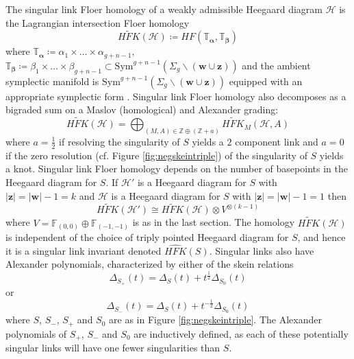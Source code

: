\documentclass[11pt]{amsart}
\theoremstyle{definition}
\theoremstyle{remark}
\def\F{\mathbb{F}}
\def\Z{\mathbb{Z}}
\def\talpha{\mathbb{T}_{\bm{\alpha}}}
\def\tbeta{\mathbb{T}_{\bm{\beta}}}
\def\Sym{\mathrm{Sym}}
\numberwithin{equation}{section}
\begin{document}
The singular link Floer homology of a weakly admissible Heegaard diagram $\mathcal{H}$ is the Lagrangian intersection Floer homology
\begin{equation}
    \widetilde{HFK}(\mathcal{H})\coloneq HF(\talpha,\tbeta)
\end{equation}
where $\talpha\coloneq \alpha_1\times\hdots\times \alpha_{g+n-1},$ $\tbeta\coloneq \beta_1\times\hdots\times \beta_{g+n-1}\subset \Sym^{g+n-1}(\Sigma_g\backslash(\bm{w}\cup\bm{z}))$ and the ambient symplectic manifold is $\Sym^{g+n-1}(\Sigma_g\backslash(\bm{w}\cup\bm{z}))$ equipped with an appropriate symplectic form \cite{perutz}.  Singular link Floer homology also decomposes as a bigraded sum on a Maslov (homological) and Alexander grading:
\begin{equation}
    \widetilde{HFK}(\mathcal{H})=\bigoplus_{(M,A)\in\Z\oplus (\Z+a)}\widetilde{HFK}_M(\mathcal{H},A)
\end{equation}
where $a=\frac{1}{2}$ if resolving the singularity of $S$ yields a $2$ component link and $a=0$ if the zero resolution (cf. Figure \ref{fig:negskeintriple}) of the singularity of $S$ yields a knot. Singular link Floer homology depends on the number of basepoints in the Heegaard diagram for $S$. If $\mathcal{H}'$ is a Heegaard diagram for $S$ with $|\bm{z}|=|\bm{w}|-1=k$ and $\mathcal{H}$ is a Heegaard diagram for $S$ with $|\bm{z}|=|\bm{w}|-1=1$ then
\begin{equation}
    \widetilde{HFK}(\mathcal{H}')\cong\widetilde{HFK}(\mathcal{H})\otimes V^{\otimes(k-1)}
\end{equation}
where $V=\F_{(0,0)}\oplus\F_{(-1,-1)}$ is as in the last section.
The homology $\widetilde{HFK}(\mathcal{H})$ is independent of the choice of triply pointed Heegaard diagram for $S$, and hence it is a singular link invariant denoted $\widehat{HFK}(S)$. Singular links also have Alexander polynomials, characterized by either of the skein relations
\begin{equation}\label{posskein}
    \Delta_{S_+}(t)=\Delta_{S}(t)+t^{\frac{1}{2}}\Delta_{S_0}(t)
\end{equation}
or
\begin{equation}\label{negskein}
    \Delta_{S_-}(t)=\Delta_{S}(t)+t^{-\frac{1}{2}}\Delta_{S_0}(t)
\end{equation}
where $S$, $S_-$, $S_+$ and $S_0$ are as in Figure \ref{fig:negskeintriple}. The Alexander polynomials of $S_+$, $S_-$ and $S_0$ are inductively defined, as each of these potentially singular links will have one fewer singularities than $S.$
\end{document}
